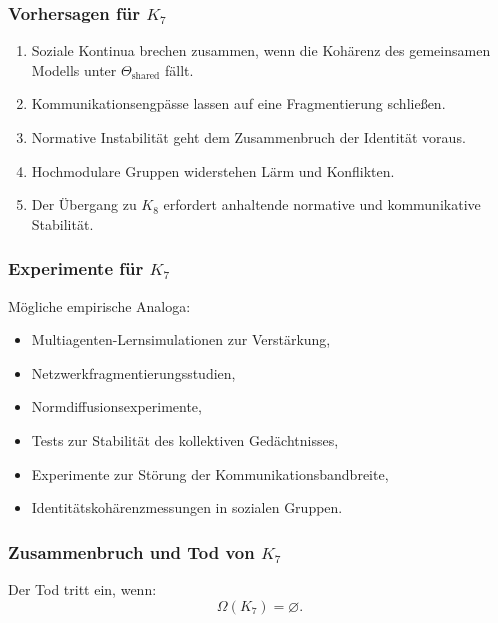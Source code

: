 \subsubsection{Vorhersagen für \texorpdfstring{$K_7$}{K_7}}

\begin{enumerate}
    \item Soziale Kontinua brechen zusammen, wenn die Kohärenz des gemeinsamen Modells unter $\Theta_{\mathrm{shared}}$ fällt.
    \item Kommunikationsengpässe lassen auf eine Fragmentierung schließen.
    \item Normative Instabilität geht dem Zusammenbruch der Identität voraus.
    \item Hochmodulare Gruppen widerstehen Lärm und Konflikten.
    \item Der Übergang zu $K_8$ erfordert anhaltende normative und kommunikative Stabilität.
\end{enumerate}

\subsubsection{Experimente für \texorpdfstring{$K_7$}{K_7}}

Mögliche empirische Analoga:
\begin{itemize}
    \item Multiagenten-Lernsimulationen zur Verstärkung,
    \item Netzwerkfragmentierungsstudien,
    \item Normdiffusionsexperimente,
    \item Tests zur Stabilität des kollektiven Gedächtnisses,
    \item Experimente zur Störung der Kommunikationsbandbreite,
    \item Identitätskohärenzmessungen in sozialen Gruppen.
\end{itemize}

\subsubsection{Zusammenbruch und Tod von \texorpdfstring{$K_7$}{K_7}}

Der Tod tritt ein, wenn:
\[
\Omega(K_7) = \varnothing.
\]

